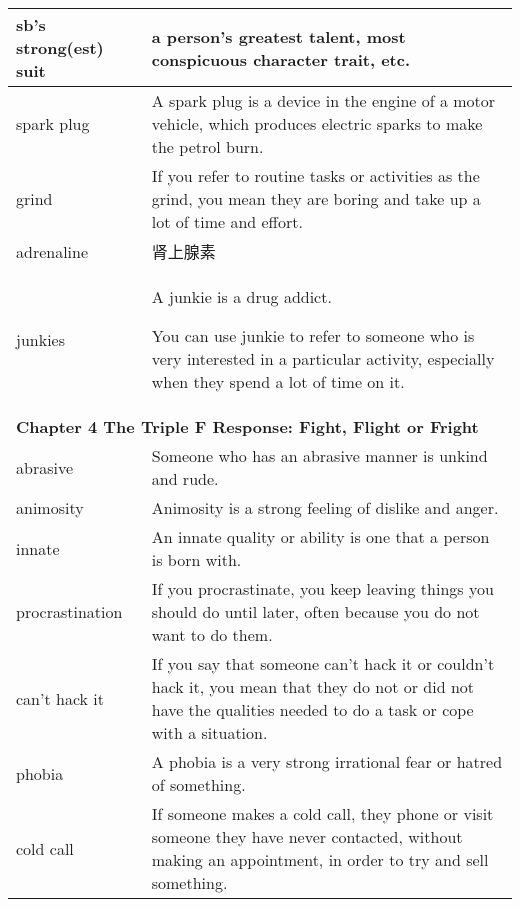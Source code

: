 \documentclass{article}
\begin{document}
\begin{center}
\begin{longtable}{|l|p{9cm}|}
\hline
sb's strong(est) suit
&
a person's greatest talent, most conspicuous character trait, etc.
\\

\hline
spark plug
&
A spark plug is a device in the engine of a motor vehicle, which produces electric sparks to make the petrol burn.
\\

\hline
grind
&
If you refer to routine tasks or activities as the grind, you mean they are boring and take up a lot of time and effort.
\\

\hline
adrenaline
&
肾上腺素
\\

\hline
junkies
&
A junkie is a drug addict.
\par
You can use junkie to refer to someone who is very interested in a particular activity, especially when they spend a lot of time on it.
\\

\hline
\multicolumn{2}{|l|}{\textbf{Chapter 4 The Triple F Response: Fight, Flight or Fright}}\\

\hline
abrasive
&
Someone who has an abrasive manner is unkind and rude.
\\

\hline
animosity
&
Animosity is a strong feeling of dislike and anger.
\\

\hline
innate
&
An innate quality or ability is one that a person is born with.
\\

\hline
procrastination
&
If you procrastinate, you keep leaving things you should do until later, often because you do not want to do them.
\\

\hline
can't hack it
&
If you say that someone can't hack it or couldn't hack it, you mean that they do not or did not have the qualities needed to do a task or cope with a situation.
\\

\hline
phobia
&
A phobia is a very strong irrational fear or hatred of something.
\\

\hline
cold call
&
If someone makes a cold call, they phone or visit someone they have never contacted, without making an appointment, in order to try and sell something.
\\


\end{longtable}
\end{center}
\end{document}
